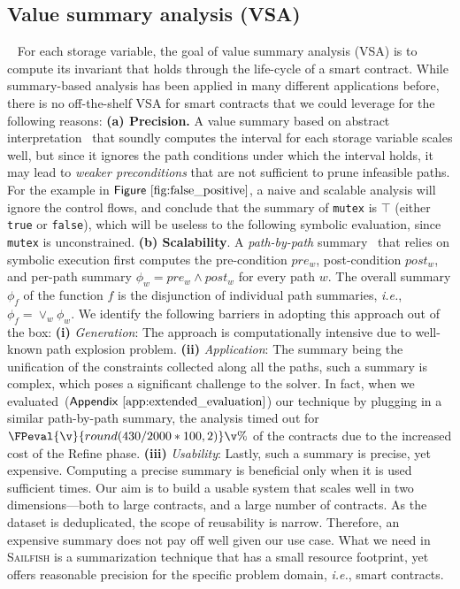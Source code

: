 \documentclass[conference, romanappendices]{tex/IEEEtran}
\theoremstyle{bfnote}
\newcommand{\toolname}{\textsc{Sailfish}\xspace}
\newcommand{\refine}{{\sc Refine}\xspace}
\newcommand{\smart}{smart contract}
\newcommand{\ie}{\textit{i.e.}}
\newcommand{\Fig}[1]{\ensuremath{\sf Figure~\ref{#1}}}
\newcommand{\Appen}[1]{\ensuremath{\sf Appendix~\ref{#1}}}
\newcommand{\clintSpeedupDataset}{2000}
\newcommand{\clintPathSummaryTimeout}{430}
\begin{document}
\subsection{\textbf{Value summary analysis (VSA)}}
~\label{sec:value-sum} 
For each storage variable, the goal of value summary analysis (VSA) is to compute
its invariant that holds through the life-cycle of a \smart.
While summary-based analysis has been applied in many different applications before, there is no off-the-shelf VSA for \smart s that we could leverage for the following reasons:
\textbf{(a) Precision.}
A value summary based on abstract interpretation~\cite{Pereira13} that soundly computes the interval for each storage variable scales well, but since it ignores the path conditions under which the interval holds, it may lead to \emph{weaker preconditions} that are not sufficient to prune infeasible paths.
For the example in \Fig{fig:false_positive}, a naive and scalable analysis will ignore the control flows, and conclude that the summary of \texttt{mutex} is $\top$ (either \texttt{true} or \texttt{false}), which will be useless to the following symbolic evaluation, since \texttt{mutex} is unconstrained.
\textbf{(b) Scalability}.
A \textit{path-by-path} summary~\cite{Godefroid07,AnandGT08} that relies on symbolic execution first computes the pre-condition $pre_w$, post-condition $post_w$, and per-path summary $\phi_w = pre_w \land post_w$ for every path $w$.
The overall summary $\phi_f$ of the function $f$ is the disjunction of individual path summaries, \ie, $\phi_f = \lor_w \phi_w$.
We identify the following barriers in adopting this approach out of the box:
\textbf{(i)} \textit{Generation}: The approach is computationally intensive due to well-known path explosion problem.
\textbf{(ii)} \textit{Application}: The summary being the unification of the constraints collected along all the paths, such a summary is complex, which poses a significant challenge to the solver.
In fact, when we evaluated~(\Appen{app:extended_evaluation}) our technique by plugging in a similar path-by-path summary, the analysis timed out for $\FPeval{\v}{round(\clintPathSummaryTimeout/\clintSpeedupDataset*100,2)}\v\%$ of the contracts due to the increased cost of the \refine phase.
\textbf{(iii)} \textit{Usability}: Lastly, such a summary is precise, yet expensive.
Computing a precise summary is beneficial only when it is used sufficient times.
Our aim is to build a usable system that scales well in two dimensions---both to large contracts, and a large number of contracts.
As the dataset is deduplicated, the scope of {reusability\EndAccSupp{}} is narrow. 
Therefore, an expensive summary does not {pay\EndAccSupp{}} off well given our use case.
What we need in \toolname is a summarization technique that has a small resource footprint, yet offers reasonable precision for the specific problem domain, \ie, \smart s.
\end{document}
